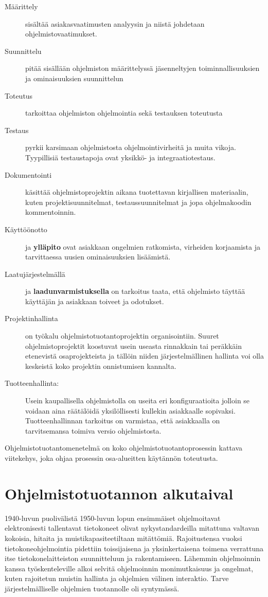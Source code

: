 \documentclass[finnish,12pt]{tktltiki2}
\theoremstyle{definition}
\theoremstyle{remark}
\begin{document}
\begin{description}
\item[Määrittely] sisältää asiakasvaatimusten analyysin ja niistä johdetaan ohjelmistovaatimukset.
\item[Suunnittelu] pitää sisällään ohjelmiston määrittelyssä jäsenneltyjen toiminnallisuuksien ja ominaisuuksien suunnittelun
\item[Toteutus] tarkoittaa ohjelmiston ohjelmointia sekä testauksen toteutusta
\item[Testaus] pyrkii karsimaan ohjelmistosta ohjelmointivirheitä ja muita vikoja. Tyypillisiä testaustapoja ovat yksikkö- ja integraatiotestaus.
\item[Dokumentointi] käsittää ohjelmistoprojektin aikana tuotettavan kirjallisen materiaalin, kuten projektisuunnitelmat, testaussuunnitelmat ja jopa ohjelmakoodin kommentoinnin.
\item[Käyttöönotto] ja \textbf{ylläpito} ovat asiakkaan ongelmien ratkomista, virheiden korjaamista ja tarvittaessa uusien ominaisuuksien lisäämistä.  
\item[Laatujärjestelmällä] ja \textbf{laadunvarmistuksella} on tarkoitus taata, että ohjelmisto täyttää käyttäjän ja asiakkaan toiveet ja odotukset.
\item[Projektinhallinta] on työkalu ohjelmistotuotantoprojektin organisointiin. Suuret ohjelmistoprojektit koostuvat usein useasta rinnakkain tai peräkkäin etenevistä osaprojekteista ja tällöin niiden järjestelmällinen hallinta voi olla keskeistä koko projektin onnistumisen kannalta. 
\item[Tuotteenhallinta:] Usein kaupallisella ohjelmistolla on useita eri konfiguraatioita jolloin se voidaan aina räätälöidä yksilöllisesti kullekin asiakkaalle sopivaksi. Tuotteenhallinnan tarkoitus on varmistaa, että asiakkaalla on tarvitsemansa toimiva versio ohjelmistosta.
\end{description}
Ohjelmistotuotantomenetelmä on koko ohjelmistotuotantoprosessin kattava viitekehys, joka ohjaa prosessin osa-alueitten käytännön toteutusta.

\section{Ohjelmistotuotannon alkutaival}
1940-luvun puolivälistä 1950-luvun lopun ensimmäiset ohjelmoitavat elektronisesti tallentavat tietokoneet olivat nykystandardeilla mitattuna valtavan kokoisia, hitaita ja muistikapasiteetiltaan mitättömiä. Rajoitustensa vuoksi tietokoneohjelmointia pidettiin toissijaisena ja yksinkertaisena toimena verrattuna itse tietokonelaitteiston suunnitteluun ja rakentamiseen. \cite{DBLP:reference/se/Grier10} Lähemmin ohjelmoinnin kanssa työskenteleville alkoi selvitä ohjelmoinnin monimutkaisuus ja ongelmat, kuten rajoitetun muistin hallinta ja ohjelmien välinen interaktio. Tarve järjestelmälliselle ohjelmien tuotannolle oli syntymässä.
\end{document}
